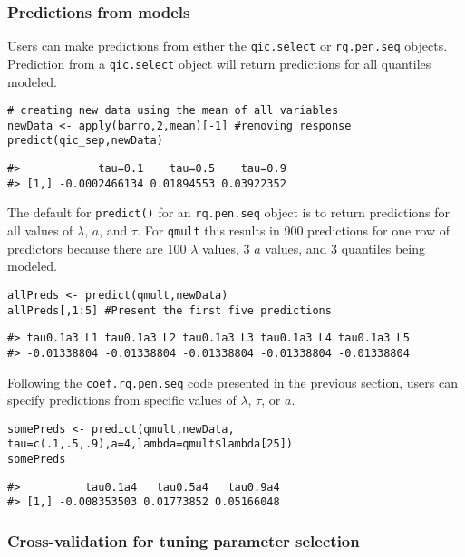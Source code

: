 \subsubsection{Predictions from models}\label{predictions-from-models}

Users can make predictions from either the \texttt{qic.select} or \texttt{rq.pen.seq} objects. Prediction from a \texttt{qic.select} object will return predictions for all quantiles modeled.

\begin{verbatim}
# creating new data using the mean of all variables
newData <- apply(barro,2,mean)[-1] #removing response
predict(qic_sep,newData)
\end{verbatim}

\begin{verbatim}
#>            tau=0.1    tau=0.5    tau=0.9
#> [1,] -0.0002466134 0.01894553 0.03922352
\end{verbatim}

The default for \texttt{predict()} for an \texttt{rq.pen.seq} object is to return predictions for all values of \(\lambda\), \(a\), and \(\tau\). For \texttt{qmult} this results in 900 predictions for one row of predictors because there are 100 \(\lambda\) values, 3 \(a\) values, and 3 quantiles being modeled.

\begin{verbatim}
allPreds <- predict(qmult,newData)
allPreds[,1:5] #Present the first five predictions
\end{verbatim}

\begin{verbatim}
#> tau0.1a3 L1 tau0.1a3 L2 tau0.1a3 L3 tau0.1a3 L4 tau0.1a3 L5 
#> -0.01338804 -0.01338804 -0.01338804 -0.01338804 -0.01338804
\end{verbatim}

Following the \texttt{coef.rq.pen.seq} code presented in the previous section, users can specify predictions from specific values of \(\lambda\), \(\tau\), or \(a\).

\begin{verbatim}
somePreds <- predict(qmult,newData, tau=c(.1,.5,.9),a=4,lambda=qmult$lambda[25])
somePreds
\end{verbatim}

\begin{verbatim}
#>          tau0.1a4   tau0.5a4   tau0.9a4
#> [1,] -0.008353503 0.01773852 0.05166048
\end{verbatim}

\subsubsection{Cross-validation for tuning parameter selection}\label{cross-validation-for-tuning-parameter-selection}

